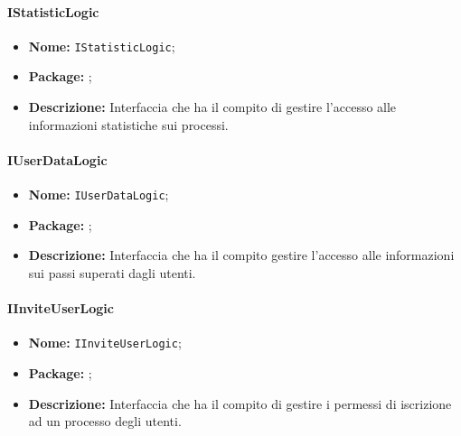 \paragraph{IStatisticLogic}
\begin{itemize}
\item \textbf{Nome:} \texttt{IStatisticLogic};
\item \textbf{Package:} \texttt{\iLogicAdmin{}};
\item \textbf{Descrizione:} Interfaccia che ha il compito di gestire l'accesso alle informazioni statistiche sui processi.
\end{itemize}


\paragraph{IUserDataLogic}
\begin{itemize}
\item \textbf{Nome:} \texttt{IUserDataLogic};
\item \textbf{Package:} \texttt{\iLogicAdmin{}};
\item \textbf{Descrizione:} Interfaccia che ha il compito gestire l'accesso alle informazioni sui passi superati dagli utenti.
\end{itemize}


\paragraph{IInviteUserLogic}
\begin{itemize}
\item \textbf{Nome:} \texttt{IInviteUserLogic};
\item \textbf{Package:} \texttt{\iLogicAdmin{}};
\item \textbf{Descrizione:} Interfaccia che ha il compito di gestire i permessi di iscrizione ad un processo degli utenti.
\end{itemize}
